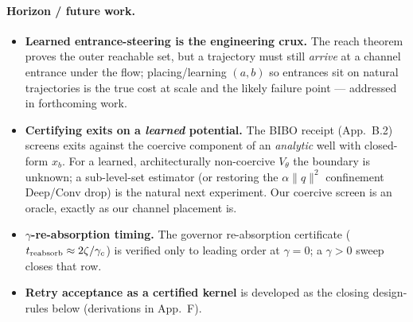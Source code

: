 \documentclass[11pt]{article}
\begin{document}
\paragraph{Horizon / future work.}
\begin{itemize}\itemsep1pt
\item \textbf{Learned entrance-steering is the engineering crux.} The reach theorem proves the outer reachable set, but a trajectory must still \emph{arrive} at a channel entrance under the flow; placing/learning $(a,b)$ so entrances sit on natural trajectories is the true cost at scale and the likely failure point --- addressed in forthcoming work.
\item \textbf{Certifying exits on a \emph{learned} potential.} The BIBO receipt (App.~B.2) screens exits against the coercive component of an \emph{analytic} well with closed-form $x_b$. For a learned, architecturally non-coercive $V_\theta$ the boundary is unknown; a sub-level-set estimator (or restoring the $\alpha\|q\|^2$ confinement Deep/Conv drop) is the natural next experiment. Our coercive screen is an oracle, exactly as our channel placement is.
\item \textbf{$\gamma$-re-absorption timing.} The governor re-absorption certificate ($t_{\rm reabsorb}\approx2\zeta/\gamma_c$) is verified only to leading order at $\gamma=0$; a $\gamma>0$ sweep closes that row.
\item \textbf{Retry acceptance as a certified kernel} is developed as the closing design-rules below (derivations in App.~F).
\end{itemize}
\end{document}
